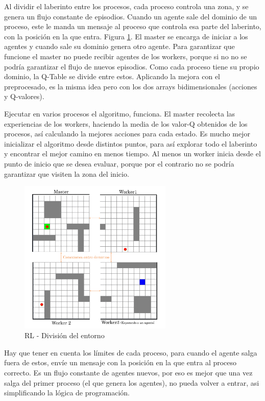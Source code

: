 	Al dividir el laberinto entre los procesos, cada proceso controla una zona, y se genera un flujo constante de episodios. Cuando un agente sale del dominio de un proceso, este le manda un mensaje al proceso que controla esa parte del laberinto, con la posición en la que entra. Figura \ref{fig:rlmpi}.
	El master se encarga de iniciar a los agentes y cuando sale su dominio genera otro agente. Para garantizar que funcione el master no puede recibir agentes de los workers, porque si no no se podría garantizar el flujo de nuevos episodios. 
	Como cada proceso tiene su propio dominio, la Q-Table se divide entre estos. Aplicando la mejora con el preprocesado, es la misma idea pero con los dos arrays bidimensionales (acciones y Q-valores). 
	
	Ejecutar en varios procesos el algoritmo, funciona. El master recolecta las experiencias de los workers, haciendo la media de los valor-Q obtenidos de los procesos, así calculando la mejores acciones para cada estado. Es mucho mejor inicializar el algoritmo desde distintos puntos, para así explorar todo el laberinto y encontrar el mejor camino en menos tiempo. Al menos un worker inicia desde el punto de inicio que se desea evaluar, porque por el contrario no se podría garantizar que visiten la zona del inicio.
	
	
	
	\begin{figure}[!h]
		\centering
		\includegraphics[width=0.65\textwidth]{images/chapter_3/rl_mpi}	
		\caption{RL - División del entorno}
		\label{fig:rlmpi}
	\end{figure}
	
	Hay que tener en cuenta los límites de cada proceso, para cuando el agente salga fuera de estos, envíe un mensaje con la posición en la que entra al proceso correcto. Es un flujo constante de agentes nuevos, por eso es mejor que una vez salga del primer proceso (el que genera los agentes), no pueda volver a entrar, asi simplificando la lógica de programación.
	
